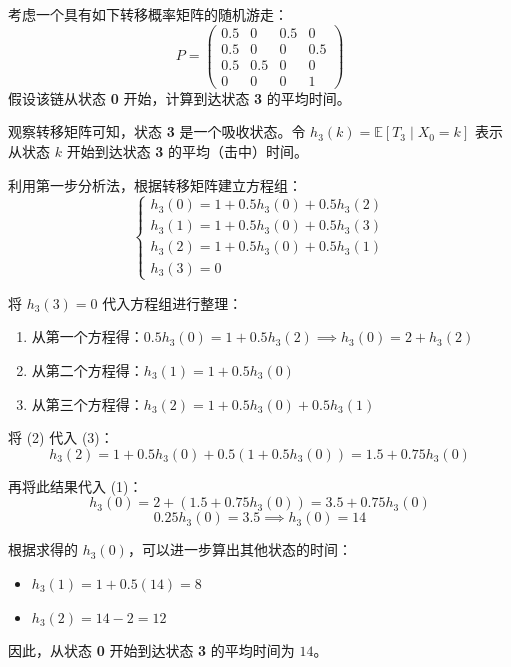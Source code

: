 \begin{questions}
\question 考虑一个具有如下转移概率矩阵的随机游走：
\[
P = \begin{pmatrix} 
0.5 & 0 & 0.5 & 0 \\
0.5 & 0 & 0 & 0.5 \\
0.5 & 0.5 & 0 & 0 \\
0 & 0 & 0 & 1 
\end{pmatrix}
\]
假设该链从状态 \textbf{0} 开始，计算到达状态 \textbf{3} 的平均时间。

\begin{solution}
    观察转移矩阵可知，状态 \textbf{3} 是一个吸收状态。令 $h_3(k) = \mathbb{E}[T_3 \mid X_0 = k]$ 表示从状态 $k$ 开始到达状态 \textbf{3} 的平均（击中）时间。

    利用第一步分析法，根据转移矩阵建立方程组：
    \[
    \begin{cases}
        h_3(0) = 1 + 0.5h_3(0) + 0.5h_3(2) \\
        h_3(1) = 1 + 0.5h_3(0) + 0.5h_3(3) \\
        h_3(2) = 1 + 0.5h_3(0) + 0.5h_3(1) \\
        h_3(3) = 0
    \end{cases}
    \]

    将 $h_3(3) = 0$ 代入方程组进行整理：
    \begin{enumerate}
        \item 从第一个方程得：$0.5h_3(0) = 1 + 0.5h_3(2) \implies h_3(0) = 2 + h_3(2)$
        \item 从第二个方程得：$h_3(1) = 1 + 0.5h_3(0)$
        \item 从第三个方程得：$h_3(2) = 1 + 0.5h_3(0) + 0.5h_3(1)$
    \end{enumerate}

    将 (2) 代入 (3)：
    \[
    h_3(2) = 1 + 0.5h_3(0) + 0.5(1 + 0.5h_3(0)) = 1.5 + 0.75h_3(0)
    \]

    再将此结果代入 (1)：
    \[
    h_3(0) = 2 + (1.5 + 0.75h_3(0)) = 3.5 + 0.75h_3(0)
    \]
    \[
    0.25h_3(0) = 3.5 \implies h_3(0) = 14
    \]

    根据求得的 $h_3(0)$，可以进一步算出其他状态的时间：
    \begin{itemize}
        \item $h_3(1) = 1 + 0.5(14) = 8$
        \item $h_3(2) = 14 - 2 = 12$
    \end{itemize}

    因此，从状态 \textbf{0} 开始到达状态 \textbf{3} 的平均时间为 $14$。
\end{solution}


\end{questions}
